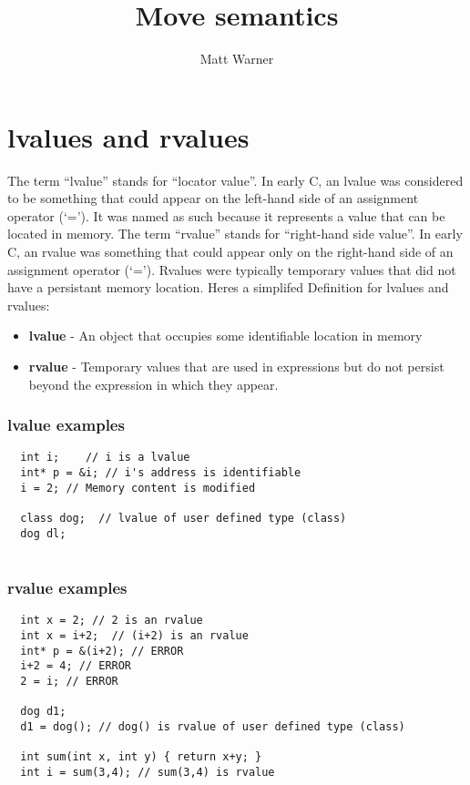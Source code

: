 \documentclass{report}
\title{\Huge{Move semantics}}
\author{\huge{Matt Warner}}
\date{\huge{}}
\begin{document}
    \maketitle
\section{lvalues and rvalues}
The term ``lvalue'' stands for ``locator value''. In early C, an lvalue was considered to be something that could appear on the left-hand side of an assignment operator (`='). It was named as such because it represents a value that can be located in memory.
\bigbreak \noindent
The term ``rvalue'' stands for ``right-hand side value''. In early C, an rvalue was something that could appear only on the right-hand side of an assignment operator (`='). Rvalues were typically temporary values that did not have a persistant memory location.
\bigbreak \noindent
Heres a simplifed Definition for lvalues and rvalues:

\begin{itemize}
  \item \textbf{lvalue} - An object that occupies some identifiable location in memory
  \item \textbf{rvalue} - Temporary values that are used in expressions but do not persist beyond the expression in which they appear. 
\end{itemize}
\subsubsection*{lvalue examples}
\begin{verbatim}
  int i;    // i is a lvalue 
  int* p = &i; // i's address is identifiable
  i = 2; // Memory content is modified

  class dog;  // lvalue of user defined type (class)
  dog dl;      
  
\end{verbatim}
\subsubsection*{rvalue examples}
\begin{verbatim}
  int x = 2; // 2 is an rvalue
  int x = i+2;  // (i+2) is an rvalue
  int* p = &(i+2); // ERROR
  i+2 = 4; // ERROR
  2 = i; // ERROR

  dog d1;
  d1 = dog(); // dog() is rvalue of user defined type (class)

  int sum(int x, int y) { return x+y; }
  int i = sum(3,4); // sum(3,4) is rvalue
\end{verbatim}
\end{document}
